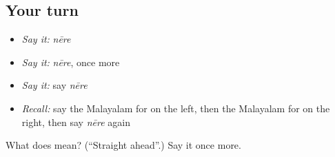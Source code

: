 \subsection*{Your turn}
\begin{itemize}
\raggedright
  \item \emph{Say it:} \emph{nēre}
  \item \emph{Say it:} \emph{nēre}, once more
  \item \emph{Say it:} say \emph{nēre}
  \item \emph{Recall:} say the Malayalam for on the left, then the Malayalam for on the right, then say \emph{nēre} again
\end{itemize}

\begin{tcolorbox}[breakable,colback=teal!4,colframe=teal!35!black,title={Before you move on}]
What does  mean? (\textquotedblleft{}Straight ahead\textquotedblright{}.) Say it once more.
\end{tcolorbox}
